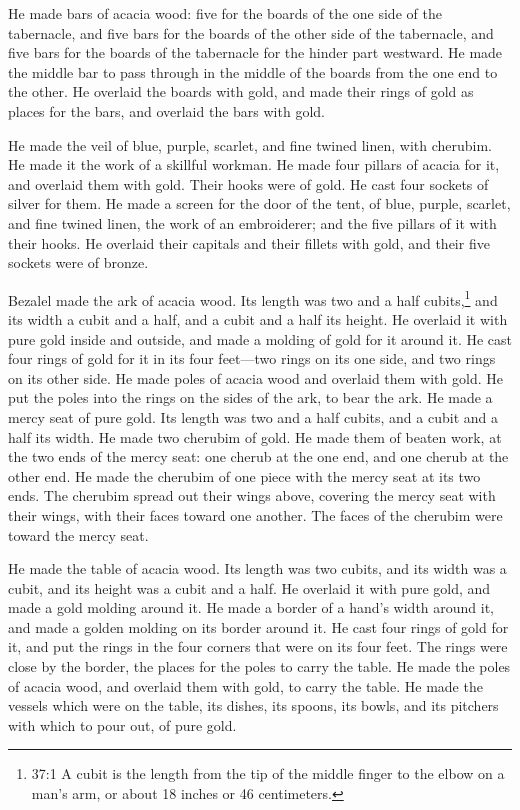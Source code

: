 \myverse{}He made bars of acacia wood: five for the boards of the one
side of the tabernacle,
\myverse{}and five bars for the boards of the other side of the tabernacle, and five
bars for the boards of the tabernacle for the hinder part westward.
\myverse{}He made the middle bar to pass through in the middle of the boards from the
one end to the other.
\myverse{}He overlaid the boards with gold, and made their rings of gold as places
for the bars, and overlaid the bars with gold.


\myverse{}He made the veil of blue, purple, scarlet, and fine twined linen,
with cherubim. He made it the work of a skillful workman.
\myverse{}He made four pillars of acacia for it, and overlaid them with gold. Their
hooks were of gold. He cast four sockets of silver for them.
\myverse{}He made a screen for the door of the tent, of blue, purple, scarlet, and
fine twined linen, the work of an embroiderer;
\myverse{}and the five pillars of it with their hooks. He overlaid their capitals and
their fillets with gold, and their five sockets were of bronze.


\mychapter{} \myverse*{}Bezalel made the ark of acacia wood. Its length was two and a
half cubits,\footnote{37:1 A cubit is the length from the tip of the middle finger to the elbow on a man’s arm, or about
	18 inches or 46 centimeters.} and its width a cubit and a half, and a cubit and a half its height.
\myverse{}He overlaid it with pure gold inside and outside, and made a molding of gold
for it around it.
\myverse{}He cast four rings of gold for it in its four feet—two rings on its one side,
and two rings on its other side.
\myverse{}He made poles of acacia wood and overlaid them with gold.
\myverse{}He put the poles into the rings on the sides of the ark, to bear the ark.
\myverse{}He made a mercy seat of pure gold. Its length was two and a half cubits, and
a cubit and a half its width.
\myverse{}He made two cherubim of gold. He made them of beaten work, at the two ends
of the mercy seat:
\myverse{}one cherub at the one end, and one cherub at the other end. He made the cherubim
of one piece with the mercy seat at its two ends.
\myverse{}The cherubim spread out their wings above, covering the mercy seat with their
wings, with their faces toward one another. The faces of the cherubim were toward the mercy seat.


\myverse{}He made the table of acacia wood. Its length was two cubits,
and its width was a cubit, and its height was a cubit and a half.
\myverse{}He overlaid it with pure gold, and made a gold molding around it.
\myverse{}He made a border of a hand’s width around it, and made a golden molding on
its border around it.
\myverse{}He cast four rings of gold for it, and put the rings in the four corners
that were on its four feet.
\myverse{}The rings were close by the border, the places for the poles to carry the
table.
\myverse{}He made the poles of acacia wood, and overlaid them with gold, to carry the
table.
\myverse{}He made the vessels which were on the table, its dishes, its spoons, its
bowls, and its pitchers with which to pour out, of pure gold.


